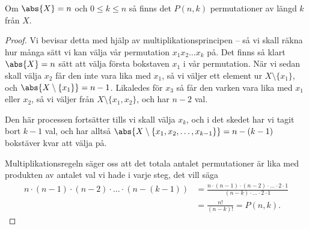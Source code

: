 \documentclass{tufte-handout}
\begin{document}
\begin{proposition}\label{prop_Pnk_counts_permutations}
	Om $\abs{X}=n$ och $0 \leq k \leq n$ så finns det $P(n,k)$ permutationer av längd $k$ från $X$.
	\begin{proof}
		Vi bevisar detta med hjälp av multiplikationsprincipen -- så vi skall räkna hur många sätt vi kan välja vår permutation $x_1x_2\ldots x_k$ på. Det finns så klart $\abs{X} = n$ sätt att välja första bokstaven $x_1$ i vår permutation. När vi sedan skall välja $x_2$ får den inte vara lika med $x_1$, så vi väljer ett element ur $X \setminus \{x_1\}$, och $\abs{X\setminus\{x_1\}} = n-1$. Likaledes för $x_3$ så får den varken vara lika med $x_1$ eller $x_2$, så vi väljer från $X\setminus \{x_1, x_2\}$, och har $n-2$ val.

		Den här processen fortsätter tills vi skall välja $x_k$, och i det skedet har vi tagit bort $k-1$ val, och har alltså $\abs{X \setminus \{x_1, x_2, \ldots, x_{k-1}\}} = n - (k-1)$ bokstäver kvar att välja på.

		Multiplikationsregeln säger oss att det totala antalet permutationer är lika med produkten av antalet val vi hade i varje steg, det vill säga
		\begin{align*}
			n\cdot(n-1)\cdot(n-2)\cdot\ldots\cdot(n-(k-1)) &= \frac{n\cdot(n-1)\cdot(n-2)\cdot\ldots\cdot2\cdot1}{(n-k)\cdot\ldots\cdot2\cdot1}\\
			&= \frac{n!}{(n-k)!} = P(n,k).
		\end{align*}
	\end{proof}
\end{proposition}
\end{document}
